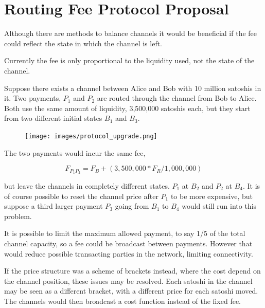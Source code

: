 \chapter{Routing Fee Protocol Proposal}

Although there are methods to balance channels it would be beneficial if the fee could reflect the state in which the channel is left.

Currently the fee is only proportional to the liquidity used, not the state of the channel.

Suppose there exists a channel between Alice and Bob with 10 million satoshis in it. 
Two payments, $P_{1}$ and $P_{2}$ are routed through the channel from Bob to Alice.
Both use the same amount of liquidity, 3,500,000 satoshis each, but they start from two different initial states $B_{1}$ and $B_3$.

\begin{figure}[!htb]
	\hspace*{-0.7cm} 
	\centering
	\texttt{[image: images/protocol\_upgrade.png]}

	\label{fig:xt_nodes}
	\hspace*{2mm} 	
\end{figure}

The two payments would incur the same fee, 

\[ F_{P_1 P_2} = F_B + (3,500,000 * F_R / 1,000,000) \]

but leave the channels in completely different states. $P_1$ at $B_2$ and $P_2$ at $B_4$. It is of course possible to reset the channel price after $P_1$ to
be more expensive, but suppose a third larger payment $P_3$ going from $B_1$ to $B_4$ would still run into this problem.

It is possible to limit the maximum allowed payment, to say 1/5 of the total channel capacity, so a fee could be broadcast between payments. However 
that would reduce possible transacting parties in the network, limiting connectivity.

If the price structure was a scheme of brackets instead, where the cost depend on the channel position, these issues may be resolved. 
Each satoshi in the channel may be seen as a different bracket, with a different price for each satoshi moved. The channels would then broadcast a cost function instead of the fixed fee.

